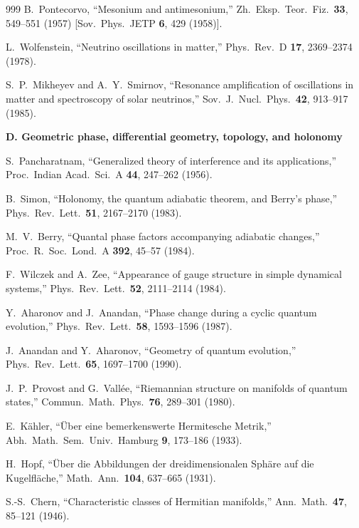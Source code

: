 \documentclass[11pt,a4paper,twoside]{book}
\theoremstyle{definition}
\begin{document}
\begin{thebibliography}{999}
B.~Pontecorvo,
``Mesonium and antimesonium,''
Zh.\ Eksp.\ Teor.\ Fiz.\ \textbf{33}, 549--551 (1957)
[Sov.\ Phys.\ JETP \textbf{6}, 429 (1958)].

L.~Wolfenstein,
``Neutrino oscillations in matter,''
Phys.\ Rev.\ D \textbf{17}, 2369--2374 (1978).

S.~P.~Mikheyev and A.~Y.~Smirnov,
``Resonance amplification of oscillations in matter and spectroscopy of solar
neutrinos,'' Sov.\ J.\ Nucl.\ Phys.\ \textbf{42}, 913--917 (1985).

\item[]\textbf{D. Geometric phase, differential geometry, topology, and holonomy}

S.~Pancharatnam,
``Generalized theory of interference and its applications,''
Proc.\ Indian Acad.\ Sci.\ A \textbf{44}, 247--262 (1956).

B.~Simon,
``Holonomy, the quantum adiabatic theorem, and Berry's phase,''
Phys.\ Rev.\ Lett.\ \textbf{51}, 2167--2170 (1983).

M.~V.~Berry,
``Quantal phase factors accompanying adiabatic changes,''
Proc.\ R.\ Soc.\ Lond.\ A \textbf{392}, 45--57 (1984).

F.~Wilczek and A.~Zee,
``Appearance of gauge structure in simple dynamical systems,''
Phys.\ Rev.\ Lett.\ \textbf{52}, 2111--2114 (1984).

Y.~Aharonov and J.~Anandan,
``Phase change during a cyclic quantum evolution,''
Phys.\ Rev.\ Lett.\ \textbf{58}, 1593--1596 (1987).

J.~Anandan and Y.~Aharonov,
``Geometry of quantum evolution,''
Phys.\ Rev.\ Lett.\ \textbf{65}, 1697--1700 (1990).

J.~P.~Provost and G.~Vall\'ee,
``Riemannian structure on manifolds of quantum states,''
Commun.\ Math.\ Phys.\ \textbf{76}, 289--301 (1980).

E.~K\"ahler,
``\"Uber eine bemerkenswerte Hermitesche Metrik,''
Abh.\ Math.\ Sem.\ Univ.\ Hamburg \textbf{9}, 173--186 (1933).

H.~Hopf,
``\"Uber die Abbildungen der dreidimensionalen Sph\"are auf die Kugelfl\"ache,''
Math.\ Ann.\ \textbf{104}, 637--665 (1931).

S.-S.~Chern,
``Characteristic classes of Hermitian manifolds,''
Ann.\ Math.\ \textbf{47}, 85--121 (1946).


\end{thebibliography}
\end{document}

